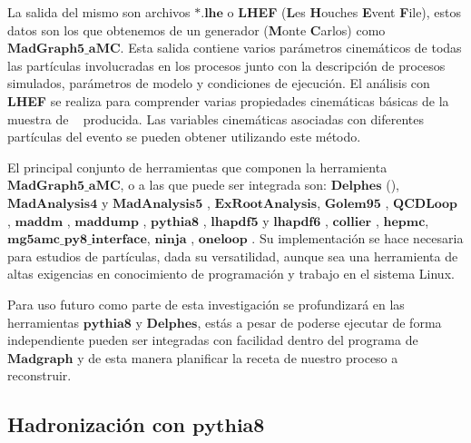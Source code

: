 
La salida del mismo son archivos $\mathbf{*.lhe}$ o \textbf{LHEF} (\textbf{L}es \textbf{H}ouches \textbf{E}vent \textbf{F}ile), estos datos son los que obtenemos de un generador \MC (\textbf{M}onte \textbf{C}arlos) como $\mathbf{MadGraph5\_aMC}$. Esta salida contiene varios parámetros cinemáticos de todas las partículas involucradas en los procesos junto con la descripción de procesos simulados, parámetros de modelo y condiciones de ejecución. El análisis con \textbf{LHEF} se realiza para comprender varias propiedades cinemáticas básicas de la muestra de \MC ~ producida. Las variables cinemáticas asociadas con diferentes partículas del evento se pueden obtener utilizando este método.


El principal conjunto de herramientas que componen la herramienta $\mathbf{MadGraph5\_aMC}$, o a las que puede ser integrada son: 
$\mathbf{Delphes}$ (\cite{de_favereau_delphes_2014-1}), 
$\mathbf{MadAnalysis4}$ y $\mathbf{MadAnalysis5}$ \citep{conte_madanalysis_2013}, 
$\mathbf{ExRootAnalysis}$, $\mathbf{Golem95}$ \citep{binoth_precise_2008}, 
$\mathbf{QCDLoop}$ %
, 
$\mathbf{maddm}$ %
, 
$\mathbf{maddump}$ %
, 
$\mathbf{pythia8}$ \citep{pythia8}, 
$\mathbf{lhapdf5}$ y 
$\mathbf{lhapdf6}$ \citep{buckley_lhapdf6_2015}, 
$\mathbf{collier}$ \citep{denner_collier_2017}, 
$\mathbf{hepmc}$, 
$\mathbf{mg5amc\_py8\_interface}$, 
$\mathbf{ninja}$ %
, 
$\mathbf{oneloop}$ %
. 
Su implementación se hace necesaria para estudios de partículas, dada su versatilidad, aunque sea una herramienta de altas exigencias en conocimiento de programación y trabajo en el sistema Linux. 

Para uso futuro como parte de esta investigación se profundizará en las herramientas $\mathbf{pythia8}$ y $\mathbf{Delphes}$, estás a pesar de poderse ejecutar de forma independiente pueden ser integradas con facilidad dentro del programa de $\mathbf{Madgraph}$ y de esta manera planificar la receta de nuestro proceso a reconstruir.



\subsection{Hadronización con $\mathbf{pythia8}$}\label{C_pythia8}

